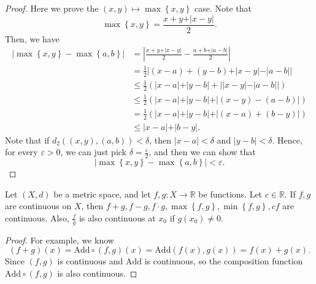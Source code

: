 \begin{proof}
    Here we prove the \((x, y) \mapsto \max \left\{ x, y \right\} \) case. Note that 
    \[
        \max \left\{ x, y \right\} = \frac{x + y + \vert x - y \vert}{2}.
    \] 
    Then, we have 
    \begin{align*}
        \left\vert \max \left\{ x, y \right\} - \max \left\{ a, b \right\}   \right\vert &= \left\vert \frac{x + y + \vert x - y \vert}{2} - \frac{a + b + \vert a - b \vert}{2} \right\vert \\
        &= \frac{1}{2} \left\vert (x - a) + (y - b) + \vert x - y \vert - \vert a - b \vert   \right\vert \\
        &\le \frac{1}{2} \left( \vert x - a \vert + \vert y - b \vert + \left\vert \vert x - y \vert - \vert a - b \vert  \right\vert  \right)  \\
        &\le \frac{1}{2} \left( \vert x - a \vert + \vert y - b \vert + \vert (x - y) - (a - b) \vert   \right) \\
        &= \frac{1}{2} \left( \vert x - a \vert + \vert y - b \vert + \vert (x - a) + (b - y) \vert   \right) \\
        &\le \vert x - a \vert  + \vert b - y \vert. 
    \end{align*}
    Note that if \(d_2 \left( (x, y), (a, b) \right) < \delta  \), then \(\vert x - a \vert < \delta  \) and \(\vert y - b \vert < \delta  \). Hence, for every \(\varepsilon > 0\), we can just pick \(\delta = \frac{\varepsilon}{2}\), and then we can show that 
    \[
        \left\vert \max \left\{ x, y \right\} - \max \left\{ a, b \right\}   \right\vert < \varepsilon. 
    \]    
\end{proof}

\begin{corollary}
    Let \((X, d)\) be a metric space, and let \(f, g: X \to \mathbb{R} \) be functions. Let \(c \in \mathbb{R} \). If \(f, g\) are continuous on \(X\), then \(f + g, f - g, f \cdot g, \max \left\{ f, g \right\}, \min \left\{ f, g \right\}, cf  \) are continuous. Also, \(\frac{f}{g}\) is also continuous at \(x_0\) if \(g(x_0) \neq 0\).        
\end{corollary}
\begin{proof}
    For example, we know 
    \[
        (f + g)(x) = \mathrm{Add} \circ \left( f, g \right)(x) = \mathrm{Add}(f(x), g(x)) = f(x) + g(x).   
    \]
    Since \((f, g)\) is continuous and \(\mathrm{Add} \) is continuous, so the composition function \(\mathrm{Add} \circ (f, g) \) is also continuous.   
\end{proof}

